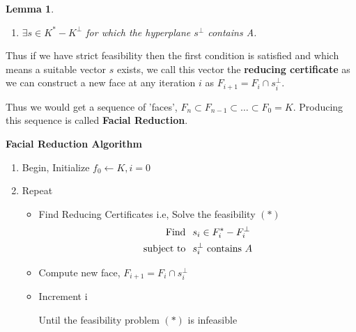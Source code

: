 \documentclass[twoside]{article}
\newtheorem{lemma}[theorem]{Lemma}
\begin{document}
\begin{multicols}{2}
\begin{itemize}
\begin{lemma}
\begin{enumerate}
	\item $\exists s \in K^*-K^{\perp}$ for which the hyperplane $s^{\perp}$ contains A.
\end{enumerate}
\end{lemma}
Thus if we have strict feasibility then the first condition is satisfied and which means a suitable vector $s$ exists, we call this vector the \textbf{reducing certificate} as we can construct a new face at any iteration $i$ as $F_{i+1} = F_{i} \cap s_{i}^{\perp}$.
\end{itemize}
Thus we would get a sequence of 'faces', $F_n \subset F_{n-1} \subset \hdots \subset F_0 = K$. Producing this sequence is called \textbf{Facial Reduction}. 

\textbf{\color{blue}Facial Reduction Algorithm}
\begin{enumerate}
	\item Begin, Initialize $f_0 \leftarrow K, i = 0$
	\item Repeat
	\begin{itemize}
		\item Find Reducing Certificates 
				i.e, Solve the feasibility $(*)$
			\begin{align*}
			\mbox{Find} \hspace{0.1in} & s_i \in F_i^*-F_i^{\perp} \\
			\mbox{subject to} \hspace{0.1in} & s_i^{\perp} \mbox{ contains } A
            \end{align*}
		\item Compute new face, $F_{i+1} = F_i \cap s_i^{\perp}$
		\item Increment i 
	       
	          Until the feasibility problem $(*)$ is infeasible
    \end{itemize}
\end{enumerate}


\end{multicols}
\end{document}
